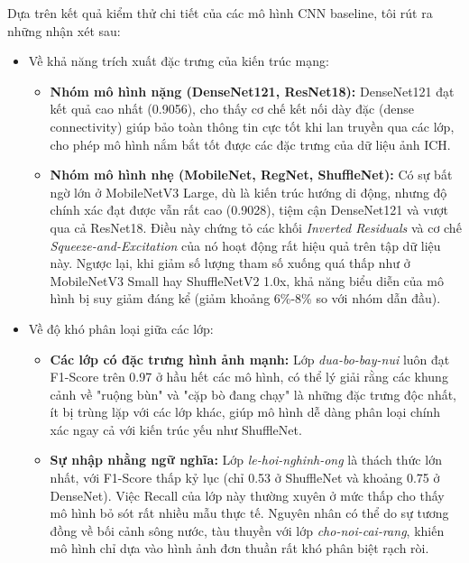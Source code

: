 \indent Dựa trên kết quả kiểm thử chi tiết của các mô hình CNN baseline, tôi rút ra những nhận xét sau:\vspace{-0.1cm}
\begin{itemize}[label={--}, itemsep=1pt]
    \item Về khả năng trích xuất đặc trưng của kiến trúc mạng:\vspace{-0.1cm}
    \begin{itemize}[label={+}, itemsep=1pt]
        \item \textbf{Nhóm mô hình nặng (DenseNet121, ResNet18):} DenseNet121 đạt kết quả cao nhất (0.9056), cho thấy cơ chế kết nối dày đặc (dense connectivity) giúp bảo toàn thông tin cực tốt khi lan truyền qua các lớp, cho phép mô hình nắm bắt tốt được các đặc trưng của dữ liệu ảnh ICH.
        \item \textbf{Nhóm mô hình nhẹ (MobileNet, RegNet, ShuffleNet):} Có sự bất ngờ lớn ở MobileNetV3 Large, dù là kiến trúc hướng di động, nhưng độ chính xác đạt được vẫn rất cao (0.9028), tiệm cận DenseNet121 và vượt qua cả ResNet18. Điều này chứng tỏ các khối \textit{Inverted Residuals} và cơ chế \textit{Squeeze-and-Excitation} của nó hoạt động rất hiệu quả trên tập dữ liệu này. Ngược lại, khi giảm số lượng tham số xuống quá thấp như ở MobileNetV3 Small hay ShuffleNetV2 1.0x, khả năng biểu diễn của mô hình bị suy giảm đáng kể (giảm khoảng 6\%-8\% so với nhóm dẫn đầu).
    \end{itemize}
    \newpage
    \item Về độ khó phân loại giữa các lớp:\vspace{-0.1cm}
    \begin{itemize}[label={+}, itemsep=1pt]
        \item \textbf{Các lớp có đặc trưng hình ảnh mạnh:} Lớp \textit{dua-bo-bay-nui} luôn đạt F1-Score trên 0.97 ở hầu hết các mô hình, có thể lý giải rằng các khung cảnh về "ruộng bùn" và "cặp bò đang chạy" là những đặc trưng độc nhất, ít bị trùng lặp với các lớp khác, giúp mô hình dễ dàng phân loại chính xác ngay cả với kiến trúc yếu như ShuffleNet.
        \item \textbf{Sự nhập nhằng ngữ nghĩa:} Lớp \textit{le-hoi-nghinh-ong} là thách thức lớn nhất, với F1-Score thấp kỷ lục (chỉ 0.53 ở ShuffleNet và khoảng 0.75 ở DenseNet). Việc Recall của lớp này thường xuyên ở mức thấp cho thấy mô hình bỏ sót rất nhiều mẫu thực tế. Nguyên nhân có thể do sự tương đồng về bối cảnh sông nước, tàu thuyền với lớp \textit{cho-noi-cai-rang}, khiến mô hình chỉ dựa vào hình ảnh đơn thuần rất khó phân biệt rạch ròi.
    \end{itemize}
\end{itemize}

